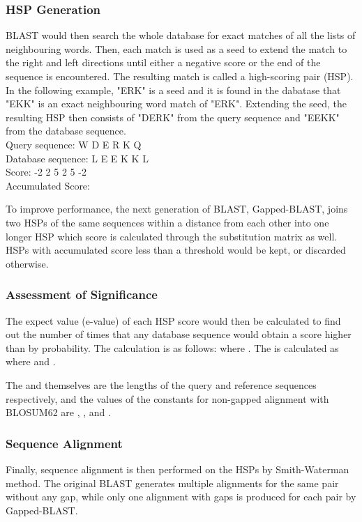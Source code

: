 \documentclass[titlepage]{csetr}
\begin{document}
\subsubsection{HSP Generation}
BLAST would then search the whole database for exact matches of all the lists of neighbouring words. Then, each match is used as a seed to extend the match to the right and left directions until either a negative score or the end of the sequence is encountered. The resulting match is called a high-scoring pair (HSP). In the following example, "ERK" is a seed and it is found in the dabatase that "EKK" is an exact neighbouring word match of "ERK". Extending the seed, the resulting HSP then consists of "DERK" from the query sequence and "EEKK" from the database sequence.\\
Query sequence:	W D E R K Q\\
Database sequence:	L E E K K L\\
Score:			-2 2 5 2 5 -2\\
Accumulated Score: 

To improve performance, the next generation of BLAST, Gapped-BLAST, joins two HSPs of the same sequences within a distance  from each other into one longer HSP which score is calculated through the substitution matrix as well. HSPs with accumulated score less than a threshold would be kept, or discarded otherwise.

\subsubsection{Assessment of Significance}
The expect value (e-value) of each HSP score would then be calculated to find out the number of times that any database sequence would obtain a score  higher than  by probability. The calculation is as follows:
 where . The  is calculated as  where  and .

The  and  themselves are the lengths of the query and reference sequences respectively, and the values of the constants for non-gapped alignment with BLOSUM62 are , , and .

\subsubsection{Sequence Alignment}
Finally, sequence alignment is then performed on the HSPs by Smith-Waterman method. The original BLAST generates multiple alignments for the same pair without any gap, while only one alignment with gaps is produced for each pair by Gapped-BLAST.
\end{document}
